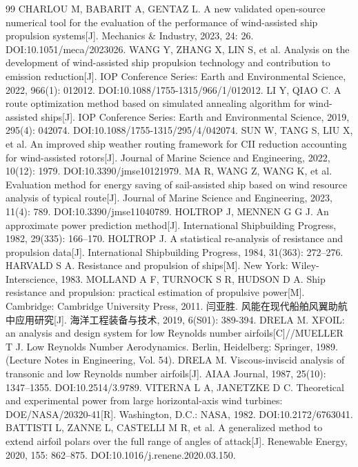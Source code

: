\documentclass[UTF8,a4paper,twoside,zihao=5,fontset=windows]{ctexart}
\begin{document}
\begin{thebibliography}{99}
CHARLOU M, BABARIT A, GENTAZ L. A new validated open-source numerical tool for the evaluation of the performance of wind-assisted ship propulsion systems[J]. Mechanics \& Industry, 2023, 24: 26. DOI:10.1051/meca/2023026.
WANG Y, ZHANG X, LIN S, et al. Analysis on the development of wind-assisted ship propulsion technology and contribution to emission reduction[J]. IOP Conference Series: Earth and Environmental Science, 2022, 966(1): 012012. DOI:10.1088/1755-1315/966/1/012012.
LI Y, QIAO C. A route optimization method based on simulated annealing algorithm for wind-assisted ships[J]. IOP Conference Series: Earth and Environmental Science, 2019, 295(4): 042074. DOI:10.1088/1755-1315/295/4/042074.
SUN W, TANG S, LIU X, et al. An improved ship weather routing framework for CII reduction accounting for wind-assisted rotors[J]. Journal of Marine Science and Engineering, 2022, 10(12): 1979. DOI:10.3390/jmse10121979.
MA R, WANG Z, WANG K, et al. Evaluation method for energy saving of sail-assisted ship based on wind resource analysis of typical route[J]. Journal of Marine Science and Engineering, 2023, 11(4): 789. DOI:10.3390/jmse11040789.
HOLTROP J, MENNEN G G J. An approximate power prediction method[J]. International Shipbuilding Progress, 1982, 29(335): 166--170.
HOLTROP J. A statistical re-analysis of resistance and propulsion data[J]. International Shipbuilding Progress, 1984, 31(363): 272--276.
HARVALD S A. Resistance and propulsion of ships[M]. New York: Wiley-Interscience, 1983.
MOLLAND A F, TURNOCK S R, HUDSON D A. Ship resistance and propulsion: practical estimation of propulsive power[M]. Cambridge: Cambridge University Press, 2011.
闫亚胜. 风能在现代船舶风翼助航中应用研究[J]. 海洋工程装备与技术, 2019, 6(S01): 389-394.
DRELA M. XFOIL: an analysis and design system for low Reynolds number airfoils[C]//MUELLER T J. Low Reynolds Number Aerodynamics. Berlin, Heidelberg: Springer, 1989. (Lecture Notes in Engineering, Vol. 54).
DRELA M. Viscous-inviscid analysis of transonic and low Reynolds number airfoils[J]. AIAA Journal, 1987, 25(10): 1347--1355. DOI:10.2514/3.9789.
VITERNA L A, JANETZKE D C. Theoretical and experimental power from large horizontal-axis wind turbines: DOE/NASA/20320-41[R]. Washington, D.C.: NASA, 1982. DOI:10.2172/6763041.
BATTISTI L, ZANNE L, CASTELLI M R, et al. A generalized method to extend airfoil polars over the full range of angles of attack[J]. Renewable Energy, 2020, 155: 862--875. DOI:10.1016/j.renene.2020.03.150.

\end{thebibliography}
\end{document}
